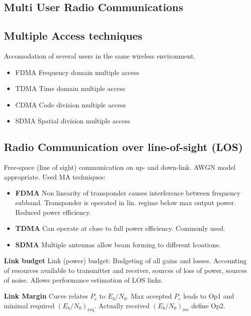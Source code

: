 \documentclass[a4paper, fontsize=8pt, landscape, DIV=1]{scrartcl}
\begin{document}
\begin{multicols*}{4}
  \section{Multi User Radio Communications}
  \subsection{Multiple Access techniques}
  Accomodation of several users in the same wireless environment.

  \begin{itemize}
    \item FDMA Frequency domain multiple access
    \item TDMA Time domain multiple access
    \item CDMA Code division multiple access
    \item SDMA Spatial division multiple access
  \end{itemize}

  \subsection{Radio Communication over line-of-sight (LOS)}
  Free-space (line of sight) communication on up- and down-link.
  AWGN model appropriate. Used MA techniques:
  \begin{itemize}
    \item \textbf{FDMA} 
    Non linearity of transponder causes interference between frequency subband.
    Transponder is operated in lin. regime below max output power. Reduced power efficiency.
    \item \textbf{TDMA}
    Can operate at close to full power efficiency. Commonly used.
    \item \textbf{SDMA}
    Multiple antennas allow beam forming to different lcoations.
  \end{itemize}

  \textbf{Link budget}
  Link (power) budget: Budgeting of all gains and losses. Accounting of resources available to transmitter
  and receiver, sources of loss of power, sources of noise. Allows performance estimation of LOS links.

  \textbf{Link Margin}
  Curve relates $P_e$ to $E_b/N_0$. Max accepted $P_e$ leads to Op1 and minimal required $(E_b/N_0)_\text{req}$.
  Actually received $(E_b/N_0)_\text{rec}$ define Op2.


\end{multicols*}
\end{document}
